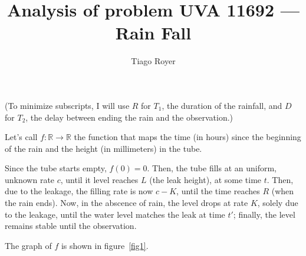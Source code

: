 \documentclass{article}
\begin{document}
\title{Analysis of problem UVA 11692 --- Rain Fall}
\date{}
\author{Tiago Royer}
\maketitle

(To minimize subscripts,
I will use $R$ for $T_1$, the duration of the rainfall,
and $D$ for $T_2$, the delay between ending the rain and the observation.)

Let's call $f: \mathbb R \to \mathbb R$
the function that maps the time (in hours) since the beginning of the rain
and the height (in millimeters) in the tube.

Since the tube starts empty, $f(0) = 0$.
Then, the tube fills at an uniform, unknown rate $c$,
until it level reaches $L$
(the leak height),
at some time $t$.
Then, due to the leakage,
the filling rate is now $c - K$,
until the time reaches $R$ (when the rain ends).
Now, in the abscence of rain,
the level drops at rate $K$,
solely due to the leakage,
until the water level matches the leak at time $t'$;
finally, the level remains stable until the observation.

The graph of $f$ is shown in figure~\ref{fig1}.
\end{document}
